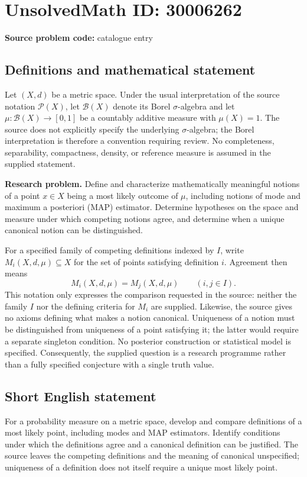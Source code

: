 \documentclass[11pt]{article}
\begin{document}
\section*{UnsolvedMath ID: 30006262}
\textbf{Source problem code:} catalogue entry
\subsection{Definitions and mathematical statement}
Let \((X,d)\) be a metric space. Under the usual interpretation of the source notation \(\mathcal P(X)\), let \(\mathcal B(X)\) denote its Borel \(\sigma\)-algebra and let \(\mu:\mathcal B(X)\to[0,1]\) be a countably additive measure with \(\mu(X)=1\). The source does not explicitly specify the underlying \(\sigma\)-algebra; the Borel interpretation is therefore a convention requiring review. No completeness, separability, compactness, density, or reference measure is assumed in the supplied statement.

\textbf{Research problem.} Define and characterize mathematically meaningful notions of a point \(x\in X\) being a most likely outcome of \(\mu\), including notions of mode and maximum a posteriori (MAP) estimator. Determine hypotheses on the space and measure under which competing notions agree, and determine when a unique canonical notion can be distinguished.

For a specified family of competing definitions indexed by \(I\), write \(M_i(X,d,\mu)\subseteq X\) for the set of points satisfying definition \(i\). Agreement then means
\[
M_i(X,d,\mu)=M_j(X,d,\mu)\qquad(i,j\in I).
\]
This notation only expresses the comparison requested in the source: neither the family \(I\) nor the defining criteria for \(M_i\) are supplied. Likewise, the source gives no axioms defining what makes a notion canonical. Uniqueness of a notion must be distinguished from uniqueness of a point satisfying it; the latter would require a separate singleton condition. No posterior construction or statistical model is specified. Consequently, the supplied question is a research programme rather than a fully specified conjecture with a single truth value.
\subsection{Short English statement}
For a probability measure on a metric space, develop and compare definitions of a most likely point, including modes and MAP estimators. Identify conditions under which the definitions agree and a canonical definition can be justified. The source leaves the competing definitions and the meaning of canonical unspecified; uniqueness of a definition does not itself require a unique most likely point.
\end{document}
